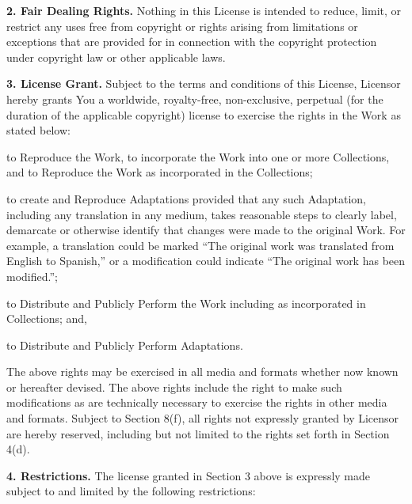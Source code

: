 \par \textbf{2. Fair Dealing Rights.} Nothing in this
License is intended to reduce, limit, or restrict any uses
free from copyright or rights arising from limitations or
exceptions that are provided for in connection with the
copyright protection under copyright law or other
applicable laws.
\par \textbf{3. License Grant.} Subject to the terms
and conditions of this License, Licensor hereby grants You
a worldwide, royalty-free, non-exclusive, perpetual (for
the duration of the applicable copyright) license to
exercise the rights in the Work as stated below:
\begin{doclicense@enumerate}
\item to Reproduce the Work, to incorporate the Work into
one or more Collections, and to Reproduce the Work as
incorporated in the Collections;
\item to create and Reproduce Adaptations provided that any
such Adaptation, including any translation in any medium,
takes reasonable steps to clearly label, demarcate or
otherwise identify that changes were made to the original
Work. For example, a translation could be marked ``The
original work was translated from English to Spanish,'' or
a modification could indicate ``The original work has been
modified.'';
\item to Distribute and Publicly Perform the Work including
as incorporated in Collections; and,
\item to Distribute and Publicly Perform Adaptations.
\end{doclicense@enumerate}
\par The above rights may be exercised in all media and
formats whether now known or hereafter devised. The above
rights include the right to make such modifications as are
technically necessary to exercise the rights in other media
and formats. Subject to Section 8(f), all rights not
expressly granted by Licensor are hereby reserved,
including but not limited to the rights set forth in
Section 4(d).
\par \textbf{4. Restrictions.} The license granted in
Section 3 above is expressly made subject to and limited by
the following restrictions:
